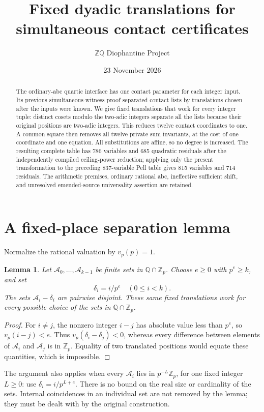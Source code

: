\documentclass[11pt]{article}
\title{Fixed dyadic translations for simultaneous contact certificates}
\author{\(\mathbb Z\mathbb Q\) Diophantine Project}
\date{23 November 2026}
\newtheorem{lemma}[theorem]{Lemma}
\newcommand{\Q}{\mathbb Q}\newcommand{\Z}{\mathbb Z}
\begin{document}
\maketitle
\begin{abstract}
The ordinary-abc quartic interface has one contact parameter for each
integer input. Its previous simultaneous-witness proof separated contact
lists by translations chosen after the inputs were known. We give fixed
translations that work for every integer tuple: distinct cosets modulo
the two-adic integers separate all the lists because their original
positions are two-adic integers. This reduces twelve contact coordinates
to one. A common square then removes all twelve private sum invariants,
at the cost of one coordinate and one equation. All substitutions are
affine, so no degree is increased. The resulting complete table has 786
variables and 685 quadratic residuals after the independently compiled
ceiling-power reduction; applying only the present transformation to the
preceding 837-variable Pell table gives 815 variables and 714 residuals.
The arithmetic premises, ordinary rational abc, ineffective sufficient
shift, and unresolved emended-source universality assertion are retained.
\end{abstract}

\section{A fixed-place separation lemma}

Normalize the rational valuation by \(v_p(p)=1\).

\begin{lemma}\label{lem:separation}
Let \(\mathcal A_0,\ldots,\mathcal A_{k-1}\) be finite sets in
\(\Q\cap\Z_p\). Choose \(e\ge0\) with \(p^e\ge k\), and set
\[
                  \delta_i=i/p^e\quad(0\le i<k).
\]
The sets \(\mathcal A_i-\delta_i\) are pairwise disjoint.
These same fixed translations work for every possible choice of the
sets in \(\Q\cap\Z_p\).
\end{lemma}
\begin{proof}
For \(i\ne j\), the nonzero integer \(i-j\) has absolute value less
than \(p^e\), so \(v_p(i-j)<e\). Thus
\(v_p(\delta_i-\delta_j)<0\), whereas every difference between
elements of \(\mathcal A_i\) and \(\mathcal A_j\) is in \(\Z_p\).
Equality of two translated positions would equate these quantities,
which is impossible.
\end{proof}

The argument also applies when every \(\mathcal A_i\) lies in
\(p^{-L}\Z_p\), for one fixed integer \(L\ge0\): use
\(\delta_i=i/p^{L+e}\).
There is no bound on the real size or cardinality of the sets.
Internal coincidences in an individual set are not removed by the lemma;
they must be dealt with by the original construction.
\end{document}
